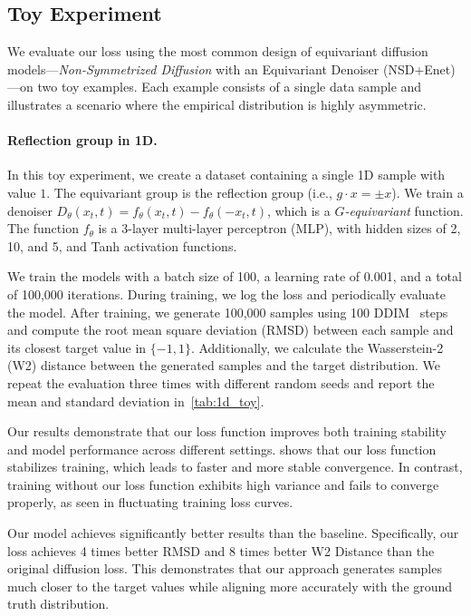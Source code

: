 
\subsection{Toy Experiment}

We evaluate our loss using the most common design of equivariant diffusion models—\emph{Non-Symmetrized Diffusion} with an Equivariant Denoiser (NSD+Enet)—on two toy examples. Each example consists of a single data sample and illustrates a scenario where the empirical distribution is highly asymmetric.

\paragraph{Reflection group in 1D.} In this toy experiment, we create a dataset containing a single 1D sample with value \( 1 \). The equivariant group is the reflection group (i.e., \( g \cdot x = \pm x \)). We train a denoiser \( D_\theta(x_t, t) = f_\theta(x_t, t) - f_\theta(-x_t, t) \), which is a \emph{\( G \)-equivariant} function. The function \( f_\theta \) is a 3-layer multi-layer perceptron (MLP), with hidden sizes of 2, 10, and 5, and Tanh activation functions. 

We train the models with a batch size of 100, a learning rate of 0.001, and a total of 100,000 iterations. During training, we log the loss and periodically evaluate the model. After training, we generate 100,000 samples using 100 DDIM~ steps and compute the root mean square deviation (RMSD) between each sample and its closest target value in \(\{-1, 1\}\). Additionally, we calculate the Wasserstein-2 (W2) distance between the generated samples and the target distribution. We repeat the evaluation three times with different random seeds and report the mean and standard deviation in~\cref{tab:1d_toy}.




Our results demonstrate that our loss function improves both training stability and model performance across different settings.  shows that our loss function stabilizes training, which leads to faster and more stable convergence. In contrast, training without our loss function exhibits high variance and fails to converge properly, as seen in fluctuating training loss curves.

Our model achieves significantly better results than the baseline. Specifically, our loss achieves 4 times better RMSD and 8 times better W2 Distance than the original diffusion loss. This demonstrates that our approach generates samples much closer to the target values while aligning more accurately with the ground truth distribution. 

